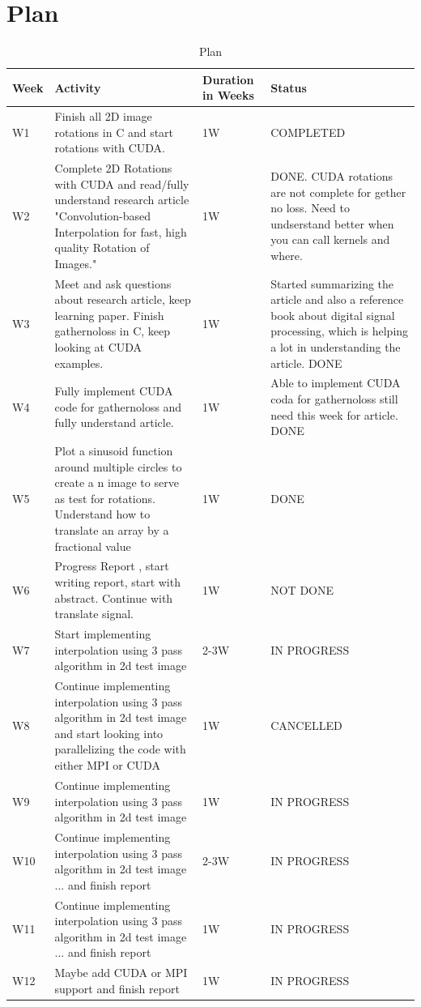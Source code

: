 \documentclass[]{usiinfbachelorproject}
\begin{document}
	\section*{Plan}
	\begin{table}
		\centering
		\scriptsize \begin{tabularx}{\linewidth}{|X|X|X|X|}
			\hline
			Week& Activity & Duration in Weeks & Status \\ \hline
			W1& Finish all 2D image rotations in C and start rotations with CUDA.& 1W& COMPLETED \\ \hline
			W2& Complete 2D Rotations with CUDA and read/fully understand research article "Convolution-based Interpolation for fast, high quality Rotation of Images."& 1W &DONE. CUDA rotations are not complete for gether no loss. Need to undserstand better when you can call kernels and where.\\ \hline
			W3&Meet and ask questions about research article,  keep learning paper. Finish gathernoloss in C, keep looking at CUDA examples. & 1W&Started summarizing the article and also a reference book about digital signal processing, which is helping a lot in understanding the article. DONE \\ \hline
			W4& Fully implement CUDA code for gathernoloss  and fully understand article.& 1W &Able to implement CUDA coda for gathernoloss still need this week for article. DONE\\ \hline
			W5& Plot a sinusoid function around multiple circles to create a n image to serve as test for rotations. Understand how to translate an array by a  fractional value&  1W & DONE \\ \hline
			W6&Progress Report , start writing report, start with abstract. Continue with translate signal.&  1W & NOT DONE\\ \hline
			W7&Start implementing interpolation using 3 pass algorithm in 2d test image& 2-3W& IN PROGRESS \\ \hline
			W8&Continue implementing interpolation using 3 pass algorithm in 2d test image  and start looking into parallelizing the code with either MPI or CUDA&1W & CANCELLED \\ \hline
			W9&Continue implementing interpolation using 3 pass algorithm in 2d test image & 1W & IN PROGRESS \\ \hline
			W10&Continue implementing interpolation using 3 pass algorithm in 2d test image ... and finish report &  2-3W & IN PROGRESS\\ \hline
			W11&Continue implementing interpolation using 3 pass algorithm in 2d test image ... and finish report&  1W & IN PROGRESS\\ \hline
			W12&Maybe add CUDA or MPI support and finish report&  1W & IN PROGRESS\\
			\hline
		\end{tabularx}\caption{Plan}
	\end{table}
	
\end{document}

